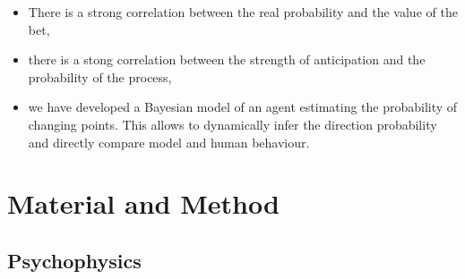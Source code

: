 \documentclass[12pt,english]{article}%
\begin{document}
\begin{itemize}\setlength{\itemsep}{0ex}
\item There is a strong correlation between the real probability and the value of the bet,

\item there is a stong correlation between the strength of anticipation and the probability of the process,

\item we have developed a Bayesian model of an agent estimating the probability of changing points. This allows to dynamically infer the direction probability and directly compare model and human behaviour.

%

\end{itemize}
\section{Material and Method}
\subsection{Psychophysics}



\end{document}
